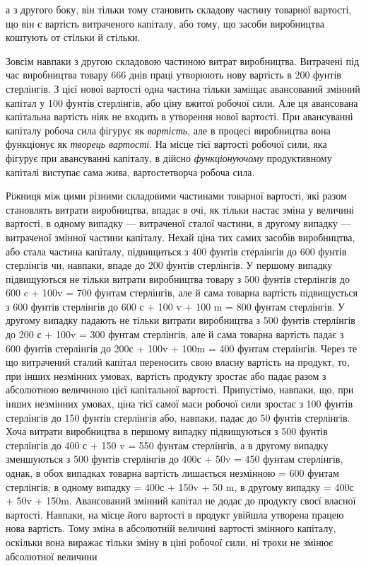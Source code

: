 \parcont{}  %
а з другого боку, він тільки тому становить складову частину
товарної вартості, що він є вартість витраченого капіталу, або
тому, що засоби виробництва коштують от стільки й стільки.

Зовсім навпаки з другою складовою частиною витрат виробництва.
Витрачені під час виробництва товару 666 днів
праці утворюють нову вартість в 200 фунтів стерлінгів. З цієї
нової вартості одна частина тільки заміщає авансований змінний
капітал у 100 фунтів стерлінгів, або ціну вжитої робочої сили.
Але ця авансована капітальна вартість ніяк не входить в утворення
нової вартості. При авансуванні капіталу робоча сила
фігурує як \emph{вартість}, але в процесі виробництва вона функціонує
як \emph{творець вартості}. На місце тієї вартості робочої сили,
яка фігурує при авансуванні капіталу, в дійсно \emph{функціонуючому}
продуктивному капіталі виступає сама жива, вартостетворча робоча
сила.

Ріжниця між цими різними складовими частинами товарної
вартості, які разом становлять витрати виробництва, впадає
в очі, як тільки настає зміна у величині вартості, в одному випадку
— витраченої сталої частини, в другому випадку — витраченої
змінної частини капіталу. Нехай ціна тих самих засобів виробництва,
або стала частина капіталу, підвищиться з 400 фунтів
стерлінгів до 600 фунтів стерлінгів чи, навпаки, впаде до
200 фунтів стерлінгів. У першому випадку підвищуються не
тільки витрати виробництва товару з 500 фунтів стерлінгів до
600 c + 100v = 700 фунтам стерлінгів, але й сама товарна вартість
підвищується з 600 фунтів стерлінгів до 600 с + 100 v + 100 m =
800 фунтам стерлінгів. У другому випадку падають не тільки
витрати виробництва з 500 фунтів стерлінгів до 200 с + 100v =
300 фунтам стерлінгів, але й сама товарна вартість падає з
600 фунтів стерлінгів до 200с + 100v + 100m = 400 фунтам стерлінгів.
Через те що витрачений сталий капітал переносить свою
власну вартість на продукт, то, при інших незмінних умовах, вартість
продукту зростає або падає разом з абсолютною величиною
цієї капітальної вартості. Припустімо, навпаки, що, при
інших незмінних умовах, ціна тієї самої маси робочої сили зростає
з 100 фунтів стерлінгів до 150 фунтів стерлінгів або,
навпаки, падає до 50 фунтів стерлінгів. Хоча витрати виробництва
в першому випадку підвищуються з 500 фунтів стерлінгів
до 400 с + 150 v = 550 фунтам стерлінгів, а в другому випадку
зменшуються з 500 фунтів стерлінгів до 400с + 50v = 450 фунтам
стерлінгів, однак, в обох випадках товарна вартість лишається
незмінною = 600 фунтам стерлінгів; в одному випадку
= 400с + 150v + 50 m, в другому випадку = 400с + 50v + 150m.
Авансований змінний капітал не додає до продукту своєї власної
вартості. Навпаки, на місце його вартості в продукт увійшла утворена
працею нова вартість. Тому зміна в абсолютній величині
вартості змінного капіталу, оскільки вона виражає тільки зміну
в ціні робочої сили, ні трохи не змінює абсолютної величини
\parbreak{}  %
